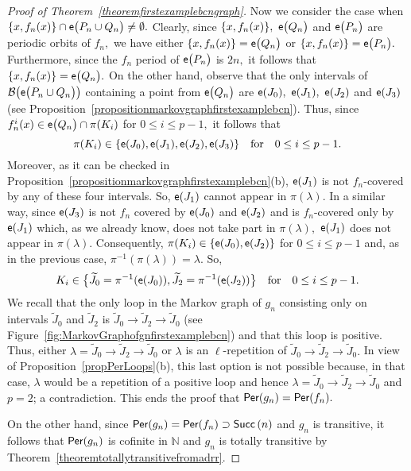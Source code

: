 \documentclass[a4paper, 11pt]{amsart}
\numberwithin{equation}{section}
\theoremstyle{customnumberedtheorem}
\theoremstyle{definitionwithbfnote}
\newcommand{\N}{\ensuremath{\mathbb{N}}}
\DeclareMathOperator{\Per}{\textsf{\upshape Per}}
\DeclareMathOperator{\Succ}{\textsf{\upshape Succ}}
\DeclareMathOperator{\eexp}{\textsf{\upshape e}}
\newcommand{\succs}[1]{\ensuremath{\Succ\left(#1\right)}}
\newcommand{\emap}[1]{\ensuremath{\eexp(#1)}}
\newcommand{\bigemap}[1]{\ensuremath{\eexp\bigl(#1\bigr)}}
\def\calB{\mathcal{B}}
\newcommand{\bigSBI}[1]{\ensuremath{\calB\bigl(#1\bigr)}}
\newcommand{\andq}[1][and]{\ensuremath{\quad\text{#1}\quad}}
\begin{document}
\begin{proof}[Proof of Theorem~\ref{theoremfirstexamplebcngraph}]
Now  we consider the case when
$\{x, f_n(x)\} \cap \bigemap{P_n \cup Q_n} \ne \emptyset.$
Clearly, since
$\{x, f_n(x)\},\ \bigemap{Q_n}$ and $\bigemap{P_n}$
are periodic orbits of $f_n,$ we have either
$\{x, f_n(x)\} = \bigemap{Q_n}$ or
$\{x, f_n(x)\} = \bigemap{P_n}.$
Furthermore, since the $f_n$ period of $\bigemap{P_n}$ is $2n,$
it follows that $\{x, f_n(x)\} = \bigemap{Q_n}.$
On the other hand, observe that the only intervals of
$\bigSBI{\bigemap{P_n \cup Q_n}}$ containing a point from $\bigemap{Q_n}$
are $\emap{J_0},\ \emap{J_1},\ \emap{J_2}$ and $\emap{J_3}$
(see Proposition~\ref{propositionmarkovgraphfirstexamplebcn}).
Thus, since $f_n^i(x) \in \bigemap{Q_n} \cap \pi(K_i)$ for $0 \le i \le p-1,$
it follows that
\[
  \pi(K_i)  \in \{\emap{J_0},\emap{J_1},\emap{J_2},\emap{J_3}\}
  \andq[for]
  0 \le i \le p-1.
\]
Moreover, as it can be checked in
Proposition~\ref{propositionmarkovgraphfirstexamplebcn}(b),
$\emap{J_1}$ is not $f_n$-covered by any of these four intervals.
So, $\emap{J_1}$ cannot appear in $\pi(\lambda).$
In a similar way, since $\emap{J_3}$ is not $f_n$ covered by
$\emap{J_0}$ and $\emap{J_2}$ and is $f_n$-covered only by
$\emap{J_1}$ which, as we already know, does not take part in
$\pi(\lambda),$ $\emap{J_1}$ does not appear in $\pi(\lambda).$
Consequently,
$
\pi(K_i)  \in \{\emap{J_0},\emap{J_2}\}
$
for $0 \le i \le p-1$ and, as in the previous case,
$\pi^{-1}(\pi(\lambda)) = \lambda.$  So,
\[
  K_i  \in \bigl\{\widetilde{J}_0 = \pi^{-1}(\emap{J_0}),\widetilde{J}_2 = \pi^{-1}(\emap{J_2})\bigr\}
  \andq[for]
  0 \le i \le p-1.
\]
We recall that the only loop in the Markov graph of $g_n$
consisting only on intervals $\widetilde{J}_0$ and $\widetilde{J}_2$
is
$
\widetilde{J}_0 \longrightarrow \widetilde{J}_2 \longrightarrow \widetilde{J}_0
$
(see Figure~\ref{fig:MarkovGraphofgnfirstexamplebcn})
and that this loop is positive.
Thus, either
$
\lambda = \widetilde{J}_0 \longrightarrow \widetilde{J}_2 \longrightarrow \widetilde{J}_0
$
or $\lambda$ is an $\ell$-repetition of
$
\widetilde{J}_0 \longrightarrow \widetilde{J}_2 \longrightarrow \widetilde{J}_0.
$
In view of Proposition~\ref{propPerLoops}(b),
this last option is not possible because, in that case,
$\lambda$ would be a repetition of a positive loop and hence
$
\lambda = \widetilde{J}_0 \longrightarrow \widetilde{J}_2 \longrightarrow \widetilde{J}_0
$
and $p = 2$; a contradiction.
This ends the proof that $\Per(g_n) = \Per(f_n).$

On the other hand, since $\Per(g_n) = \Per(f_n) \supset \succs{n}$
and $g_n$ is transitive, it follows that $\Per(g_n)$ is cofinite in
$\N$ and $g_n$ is totally transitive by
Theorem~\ref{theoremtotallytransitivefromadrr}.


\end{proof}
\end{document}
